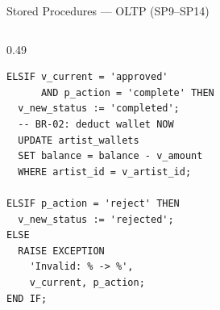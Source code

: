 \begin{frame}[fragile]{Stored Procedures --- OLTP (SP9--SP14)}
\begin{columns}[T]
\begin{column}{0.49\textwidth}
\begin{lstlisting}[caption={SP12: FSM state machine}]
ELSIF v_current = 'approved'
      AND p_action = 'complete' THEN
  v_new_status := 'completed';
  -- BR-02: deduct wallet NOW
  UPDATE artist_wallets
  SET balance = balance - v_amount
  WHERE artist_id = v_artist_id;

ELSIF p_action = 'reject' THEN
  v_new_status := 'rejected';
ELSE
  RAISE EXCEPTION
    'Invalid: % -> %',
    v_current, p_action;
END IF;
            \end{lstlisting}
        \end{column}
    \end{columns}

\end{frame}
